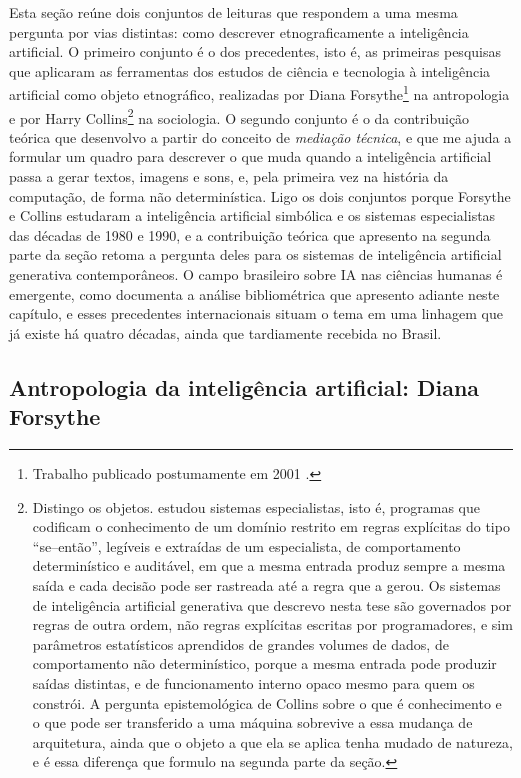 Esta seção reúne dois conjuntos de leituras que respondem a uma mesma pergunta por vias distintas: como descrever etnograficamente a inteligência artificial. O primeiro conjunto é o dos precedentes, isto é, as primeiras pesquisas que aplicaram as ferramentas dos estudos de ciência e tecnologia à inteligência artificial como objeto etnográfico, realizadas por Diana Forsythe\footnote{Trabalho publicado postumamente em 2001 \parencite{Forsythe2001}.} na antropologia e por Harry Collins\footnote{Distingo os objetos. \textcite{Collins2012Expert} estudou sistemas especialistas, isto é, programas que codificam o conhecimento de um domínio restrito em regras explícitas do tipo \enquote{se--então}, legíveis e extraídas de um especialista, de comportamento determinístico e auditável, em que a mesma entrada produz sempre a mesma saída e cada decisão pode ser rastreada até a regra que a gerou. Os sistemas de inteligência artificial generativa que descrevo nesta tese são governados por regras de outra ordem, não regras explícitas escritas por programadores, e sim parâmetros estatísticos aprendidos de grandes volumes de dados, de comportamento não determinístico, porque a mesma entrada pode produzir saídas distintas, e de funcionamento interno opaco mesmo para quem os constrói. A pergunta epistemológica de Collins sobre o que é conhecimento e o que pode ser transferido a uma máquina sobrevive a essa mudança de arquitetura, ainda que o objeto a que ela se aplica tenha mudado de natureza, e é essa diferença que formulo na segunda parte da seção.} na sociologia. O segundo conjunto é o da contribuição teórica que desenvolvo a partir do conceito de \textit{mediação técnica}, e que me ajuda a formular um quadro para descrever o que muda quando a inteligência artificial passa a gerar textos, imagens e sons, e, pela primeira vez na história da computação, de forma não determinística. Ligo os dois conjuntos porque Forsythe e Collins estudaram a inteligência artificial simbólica e os sistemas especialistas das décadas de 1980 e 1990, e a contribuição teórica que apresento na segunda parte da seção retoma a pergunta deles para os sistemas de inteligência artificial generativa contemporâneos. O campo brasileiro sobre IA nas ciências humanas é emergente, como documenta a análise bibliométrica que apresento adiante neste capítulo, e esses precedentes internacionais situam o tema em uma linhagem que já existe há quatro décadas, ainda que tardiamente recebida no Brasil.

\subsection{Antropologia da inteligência artificial: Diana Forsythe}

